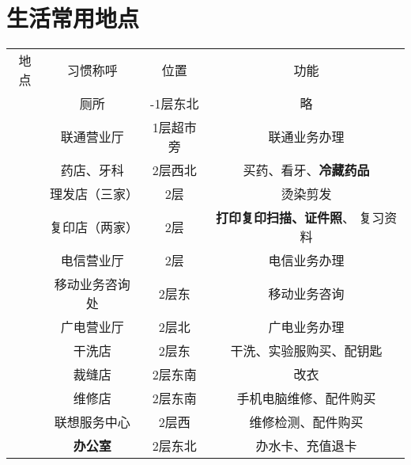 \section[生活常用地点]{生活常用地点}
\label{common_locations}
\begin{table}[H]
    \centering
    \begin{tabular}{|c|c|c|c|}
        \Xhline{1.2pt}
        地点                    & 习惯称呼          & 位置         & 功能                           \\
        \Xhline{1.2pt}
        \multirow{16}{*}{大服}  & 厕所            & -1层东北      & 略                            \\
        \cline{2-4}
                              & 联通营业厅         & 1层超市旁      & 联通业务办理                       \\
        \cline{2-4}
                              & 药店、牙科         & 2层西北       & 买药、看牙、\textbf{冷藏药品}          \\
        \cline{2-4}
                              & 理发店（三家）       & 2层         & 烫染剪发                         \\
        \cline{2-4}
                              & 复印店（两家）       & 2层         & \textbf{打印复印扫描、证件照}、 复习资料    \\
        \cline{2-4}
                              & 电信营业厅         & 2层         & 电信业务办理                       \\
        \cline{2-4}
                              & 移动业务咨询处       & 2层东        & 移动业务咨询                       \\
        \cline{2-4}
                              & 广电营业厅         & 2层北        & 广电业务办理                       \\
        \cline{2-4}
                              & 干洗店           & 2层东        & 干洗、实验服购买、配钥匙                 \\
        \cline{2-4}
                              & 裁缝店           & 2层东南       & 改衣                           \\
        \cline{2-4}
                              & 维修店           & 2层东南       & 手机电脑维修、配件购买                  \\
        \cline{2-4}
                              & 联想服务中心        & 2层西        & 维修检测、配件购买                    \\
        \cline{2-4}
                              & \textbf{办公室}  & 2层东北       & 办水卡、充值退卡                     \\

\end{tabular}
\end{table}
